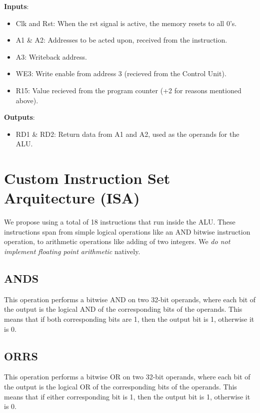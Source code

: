 \documentclass[9pt,a4paper,twoside]{tau}
\begin{document}
    \textbf{Inputs}:
    \begin{itemize}
        \item Clk and Rst: When the rst signal is active, the memory resets to all 0's.
        \item A1 \& A2: Addresses to be acted upon, received from the instruction.
        \item A3: Writeback address.
        \item WE3: Write enable from address 3 (recieved from the Control Unit).
        \item R15: Value recieved from the program counter (+2 for reasons mentioned above).
    \end{itemize}
    
    \textbf{Outputs}:
    \begin{itemize}
    \item RD1 \& RD2: Return data from A1 and A2, used as the operands for the ALU.
    \end{itemize}
    






        \section{Custom Instruction Set Arquitecture (ISA)}


        We propose using a total of 18 instructions that run inside the ALU. These instructions span from simple logical operations like an AND bitwise instruction operation, to arithmetic operations like adding of two integers. We \textit{do not implement floating point arithmetic} natively. 
    
        \subsection{ANDS}
        This operation performs a bitwise AND on two 32-bit operands, where each bit of the output is the logical AND of the corresponding bits of the operands. This means that if both corresponding bits are 1, then the output bit is 1, otherwise it is 0. 
        \subsection{ORRS}
        This operation performs a bitwise OR on two 32-bit operands, where each bit of the output is the logical OR of the corresponding bits of the operands. This means that if either corresponding bit is 1, then the output bit is 1, otherwise it is 0. 
\end{document}
